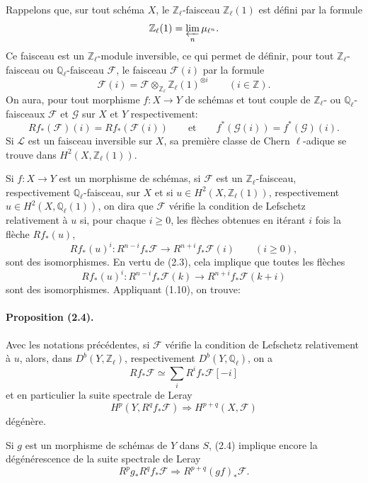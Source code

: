 \documentclass[10pt]{article}
\newcommand{\Fcal}{\mathcal F}
\newcommand{\Gcal}{\mathcal G}
\newcommand{\Z}{\mathbb Z}
\newcommand{\Q}{\mathbb Q}
\newcommand{\og}{\guillemotleft}
\newcommand{\fg}{\guillemotright}
\providecommand{\og}{\guillemotleft}
\providecommand{\fg}{\guillemotright}
\begin{document}
Rappelons que, sur tout schéma $X$, le $\Z_\ell$-faisceau $\Z_\ell(1)$ est défini par la formule
\[
\Z_\ell(1)=\varprojlim_n\mu_{\ell^n}.
\]
Ce faisceau est un $\Z_\ell$-module inversible, ce qui permet de définir, pour tout $\Z_\ell$-faisceau ou $\Q_\ell$-faisceau $\Fcal$, le \og faisceau\fg{} $\Fcal(i)$ par la formule
\[
\Fcal(i)=\Fcal\otimes_{\Z_\ell}\Z_\ell(1)^{\otimes i}\qquad(i\in\Z).
\]
On aura, pour tout morphisme $f:X\to Y$ de schémas et tout couple de $\Z_\ell$- ou $\Q_\ell$-faisceaux $\Fcal$ et $\Gcal$ sur $X$ et $Y$ respectivement:
\[
\tag{2.3}
Rf_*(\Fcal)(i)=Rf_*(\Fcal(i))\qquad\text{et}\qquad f^*(\Gcal(i))=f^*(\Gcal)(i).
\]
Si $\mathcal L$ est un faisceau inversible sur $X$, sa première classe de Chern $\ell$-adique se trouve dans $H^2(X,\Z_\ell(1))$.

Si $f:X\to Y$ est un morphisme de schémas, si $\Fcal$ est un $\Z_\ell$-faisceau, respectivement $\Q_\ell$-faisceau, sur $X$ et si $u\in H^2(X,\Z_\ell(1))$, respectivement $u\in H^2(X,\Q_\ell(1))$, on dira que $\Fcal$ vérifie la condition de Lefschetz relativement à $u$ si, pour chaque $i\ge0$, les flèches obtenues en itérant $i$ fois la flèche $Rf_*(u)$,
\[
Rf_*(u)^i:R^{n-i}f_*\Fcal\longrightarrow R^{n+i}f_*\Fcal(i)\qquad(i\ge0),
\]
sont des isomorphismes. En vertu de (2.3), cela implique que toutes les flèches
\[
Rf_*(u)^i:R^{n-i}f_*\Fcal(k)\longrightarrow R^{n+i}f_*\Fcal(k+i)
\]
sont des isomorphismes. Appliquant (1.10), on trouve:

\paragraph{Proposition (2.4).} Avec les notations précédentes, si $\Fcal$ vérifie la condition de Lefschetz relativement à $u$, alors, dans $D^b(Y,\Z_\ell)$, respectivement $D^b(Y,\Q_\ell)$, on a
\[
\tag{2.5}
Rf_*\Fcal\simeq\sum_iR^if_*\Fcal[-i]
\]
et en particulier la suite spectrale de Leray
\[
H^p(Y,R^qf_*\Fcal)\Longrightarrow H^{p+q}(X,\Fcal)
\]
dégénère.



Si $g$ est un morphisme de schémas de $Y$ dans $S$, (2.4) implique encore la dégénérescence de la suite spectrale de Leray
\[
R^p g_* R^q f_*\mathcal F\Longrightarrow R^{p+q}(gf)_*\mathcal F.
\]
\end{document}
